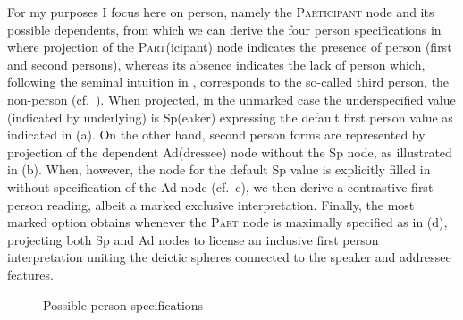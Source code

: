 \documentclass[output=paper]{langsci/langscibook}
\begin{document}
For my purposes I focus here on person, namely the \textsc{Participant} node
and its possible dependents, from which we can derive the four person
specifications in  where projection of the
P\textsc{art}(icipant) node indicates the presence of person
(first and second persons), whereas its absence
indicates the lack of person which, following the seminal intuition in
\citet{Benveniste:1956a}, corresponds to the so-called third
person, the non-person (cf.\ \citealt[488]{HarRit2002}). When projected, in
the unmarked case the underspecified value (indicated by underlying) is
Sp(eaker) expressing the default first person value as
indicated in (a). On the other hand, second person forms are
represented by projection of the dependent Ad(dressee) node without the Sp
node, as illustrated in (b). When, however, the node for the default Sp value
is explicitly filled in without specification of the Ad node (cf.\ c), we then
derive a contrastive first person reading, albeit a marked exclusive
interpretation. Finally, the most marked option obtains whenever the
\textsc{Part} node is maximally specified as in (d), projecting both Sp and Ad
nodes to license an inclusive first person interpretation uniting the deictic
spheres connected to the speaker and addressee features.

\begin{figure}
    \caption{Possible person specifications}\label{fig:key:3}


\end{figure}
\end{document}
